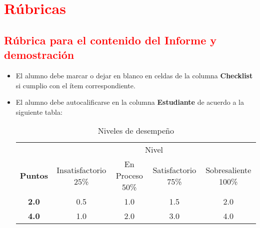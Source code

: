 	\clearpage
 	\section{\textcolor{red}{Rúbricas}}

	\subsection{\textcolor{red}{Rúbrica para el contenido del Informe y demostración}}
	\begin{itemize}			
		\item El alumno debe marcar o dejar en blanco en celdas de la columna \textbf{Checklist} si cumplio con el ítem correspondiente.
		\item El alumno debe autocalificarse en la columna \textbf{Estudiante} de acuerdo a la siguiente tabla:
	
		\begin{table}[ht]
			\caption{Niveles de desempeño}
			\begin{center}
			\begin{tabular}{ccccc}
    			\hline
    			 & \multicolumn{4}{c}{Nivel}\\
    			\cline{1-5}
    			\textbf{Puntos} & Insatisfactorio 25\%& En Proceso 50\% & Satisfactorio 75\% & Sobresaliente 100\%\\
    			\textbf{2.0}&0.5&1.0&1.5&2.0\\
    			\textbf{4.0}&1.0&2.0&3.0&4.0\\
    		\hline
			\end{tabular}
		\end{center}
	\end{table}	
	
	\end{itemize}
	
